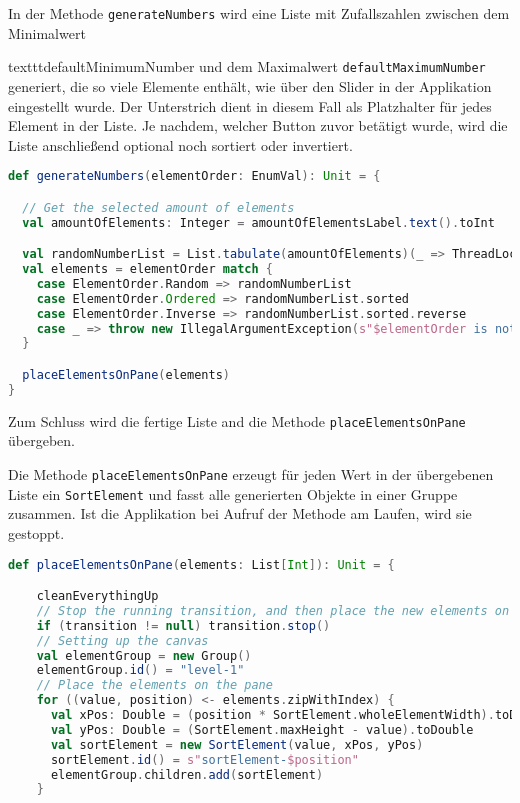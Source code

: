 In der Methode \texttt{generateNumbers} wird eine Liste mit Zufallszahlen zwischen dem Minimalwert {texttt{defaultMinimumNumber} und dem Maximalwert \texttt{defaultMaximumNumber} generiert, die so viele Elemente enthält, wie über den Slider in der Applikation eingestellt wurde. Der Unterstrich dient in diesem Fall als Platzhalter für jedes Element in der Liste. Je nachdem, welcher Button zuvor betätigt wurde, wird die Liste  anschließend optional noch sortiert oder invertiert.

\begin{lstlisting}[language=Scala]
def generateNumbers(elementOrder: EnumVal): Unit = {

  // Get the selected amount of elements
  val amountOfElements: Integer = amountOfElementsLabel.text().toInt

  val randomNumberList = List.tabulate(amountOfElements)(_ => ThreadLocalRandom.current.nextInt(defaultMinimumNumber, defaultMaximumNumber + 1))
  val elements = elementOrder match {
    case ElementOrder.Random => randomNumberList
    case ElementOrder.Ordered => randomNumberList.sorted
    case ElementOrder.Inverse => randomNumberList.sorted.reverse
    case _ => throw new IllegalArgumentException(s"$elementOrder is not supported")
  }

  placeElementsOnPane(elements)
}
\end{lstlisting}

Zum Schluss wird die fertige Liste and die Methode \texttt{placeElementsOnPane} übergeben.

Die Methode \texttt{placeElementsOnPane} erzeugt für jeden Wert in der übergebenen Liste ein \texttt{SortElement} und fasst alle generierten Objekte in einer Gruppe zusammen. Ist die Applikation bei Aufruf der Methode am Laufen, wird sie gestoppt.

\begin{lstlisting}[language=Scala]
  def placeElementsOnPane(elements: List[Int]): Unit = {

    cleanEverythingUp
    // Stop the running transition, and then place the new elements on the pane
    if (transition != null) transition.stop()
    // Setting up the canvas
    val elementGroup = new Group()
    elementGroup.id() = "level-1"
    // Place the elements on the pane
    for ((value, position) <- elements.zipWithIndex) {
      val xPos: Double = (position * SortElement.wholeElementWidth).toDouble
      val yPos: Double = (SortElement.maxHeight - value).toDouble
      val sortElement = new SortElement(value, xPos, yPos)
      sortElement.id() = s"sortElement-$position"
      elementGroup.children.add(sortElement)
    }


\end{lstlisting}}
